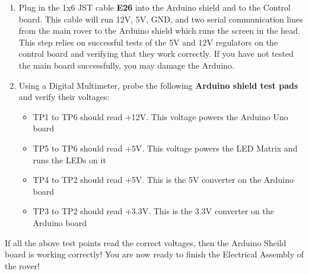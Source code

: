 \documentclass{article}
\begin{document}
\begin{enumerate}

	\item Plug in the 1x6 JST cable \textbf{E26} into the Arduino shield and to the Control board. This cable will run 12V, 5V, GND, and two serial communication lines from the main rover to the Arduino shield which runs the screen in the head. This step relies on successful tests of the 5V and 12V regulators on the control board and verifying that they work correctly.  If you have not tested the main board successfully, you may damage the Arduino.

	\item Using a Digital Multimeter, probe the following \textbf{Arduino shield test pads} and verify their voltages:
		\begin{itemize}
			\item TP1 to TP6 should read +12V. This voltage powers the Arduino Uno board
			\item TP5 to TP6 should read +5V. This voltage powers the LED Matrix and runs the LEDs on it
			\item TP4 to TP2 should read +5V. This is the 5V converter on the Arduino board
			\item TP3 to TP2 should read +3.3V. This is the 3.3V converter on the Arduino board
				
		\end{itemize}

\end{enumerate}

If all the above test points read the correct voltages, then the Arduino Sheild board is working correctly!  You are now ready to finish the Electrical Assembly of the rover!
\end{document}
